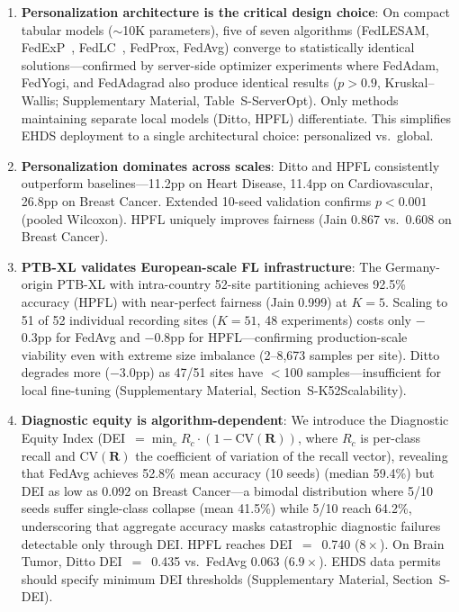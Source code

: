 \documentclass[conference]{IEEEtran}
\begin{document}
\begin{enumerate}
    \item \textbf{Personalization architecture is the critical design choice}: On compact tabular models ($\sim$10K parameters), five of seven algorithms (FedLESAM, FedExP~\cite{jhunjhunwala2023fedexp}, FedLC~\cite{zhang2022fedlc}, FedProx, FedAvg) converge to statistically identical solutions---confirmed by server-side optimizer experiments where FedAdam, FedYogi, and FedAdagrad also produce identical results ($p{>}0.9$, Kruskal--Wallis; Supplementary Material, Table~S-ServerOpt). Only methods maintaining separate local models (Ditto, HPFL) differentiate. This simplifies EHDS deployment to a single architectural choice: personalized vs.\ global.

    \item \textbf{Personalization dominates across scales}: Ditto and HPFL consistently outperform baselines---11.2pp on Heart Disease, 11.4pp on Cardiovascular, 26.8pp on Breast Cancer. Extended 10-seed validation confirms $p < 0.001$ (pooled Wilcoxon). HPFL uniquely improves fairness (Jain 0.867 vs.\ 0.608 on Breast Cancer).

    \item \textbf{PTB-XL validates European-scale FL infrastructure}: The Germany-origin PTB-XL with intra-country 52-site partitioning achieves 92.5\% accuracy (HPFL) with near-perfect fairness (Jain 0.999) at $K{=}5$. Scaling to 51 of 52 individual recording sites ($K{=}51$, 48 experiments) costs only $-$0.3pp for FedAvg and $-$0.8pp for HPFL---confirming production-scale viability even with extreme size imbalance (2--8,673 samples per site). Ditto degrades more ($-$3.0pp) as 47/51 sites have $<$100 samples---insufficient for local fine-tuning (Supplementary Material, Section~S-K52Scalability).

    \item \textbf{Diagnostic equity is algorithm-dependent}: We introduce the Diagnostic Equity Index (DEI~$= \min_c R_c \cdot (1 - \text{CV}(\mathbf{R}))$, where $R_c$ is per-class recall and $\text{CV}(\mathbf{R})$ the coefficient of variation of the recall vector), revealing that FedAvg achieves 52.8\% mean accuracy (10 seeds) (median 59.4\%) but DEI as low as 0.092 on Breast Cancer---a bimodal distribution where 5/10 seeds suffer single-class collapse (mean 41.5\%) while 5/10 reach 64.2\%, underscoring that aggregate accuracy masks catastrophic diagnostic failures detectable only through DEI. HPFL reaches DEI~$=$~0.740 ($8\times$). On Brain Tumor, Ditto DEI~$=$~0.435 vs.\ FedAvg 0.063 ($6.9\times$). EHDS data permits should specify minimum DEI thresholds (Supplementary Material, Section~S-DEI).


\end{enumerate}
\end{document}
